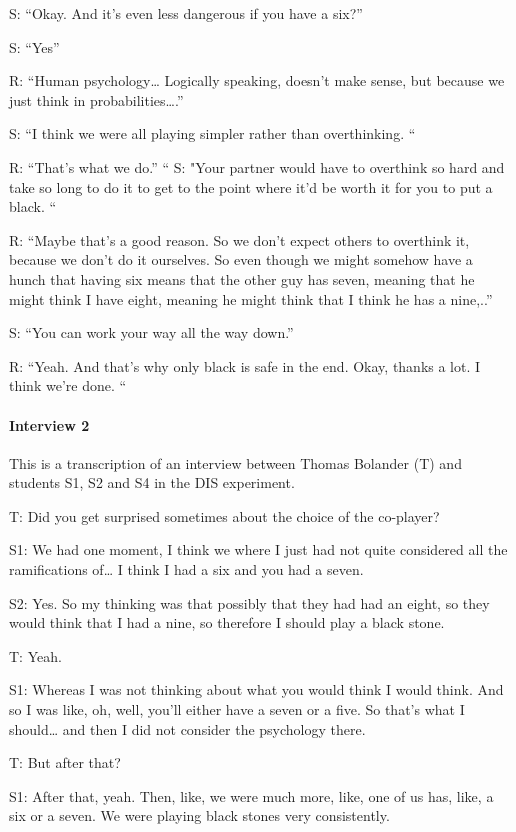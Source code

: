 \documentclass[a4paper,superscriptaddress,nofootinbib]{revtex4}
\begin{document}
S: “Okay. And it's even less dangerous if you have a six?”

S: “Yes”

R: “Human psychology… Logically speaking, doesn't make sense, but because we just think in probabilities….”

S: “I think we were all playing simpler rather than overthinking. “

R: “That's what we do.” 
“
S: "Your partner would have to overthink so hard and take so long to do it to get to the point where it'd be worth it for you to put a black. “

R: “Maybe that's a good reason. So we don't expect others to overthink it, because we don't do it ourselves. So even though we might somehow have a hunch that having six means that the other guy has seven, meaning that he might think I have eight, meaning he might think that I think he has a nine,..”

S: “You can work your way all the way down.”

R: “Yeah. And that's why only black is safe in the end. Okay, thanks a lot. I think we're done. “




\bigskip
\paragraph{Interview 2}
This is a transcription of an interview between Thomas Bolander (T) and students S1, S2 and S4 in the DIS experiment.

\medskip
T: Did you get surprised sometimes about the choice of the co-player? 

S1: We had one moment, I think we where I just had not quite considered all the ramifications of… I think I had a six and you had a seven. 

S2: Yes. So my thinking was that possibly that they had had an eight, so they would think that I had a nine, so therefore I should play a black stone.

T: Yeah. 

S1: Whereas I was not thinking about what you would think I would think. And so I was like, oh, well, you'll either have a seven or a five. So that's what I should… and then I did not consider the psychology there.

T: But after that?

S1: After that, yeah. Then, like, we were much more, like, one of us has, like, a six or a seven. We were playing black stones very consistently. 
\end{document}

